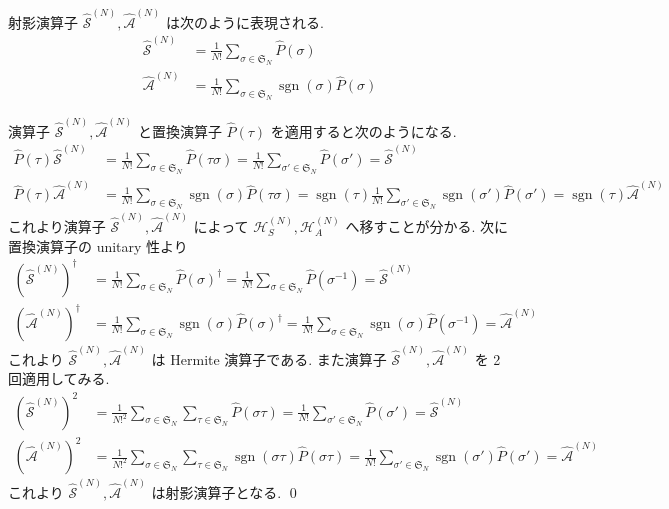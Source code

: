 \documentclass[uplatex,dvipdfmx,a4paper,11pt]{jlreq}
\makeatletter
\DeclareMathOperator{\sgn}{sgn}
\newcommand{\HH}{\mathcal{H}}
\renewcommand{\SS}{\mathfrak{S}}
\renewcommand{\S}{\mathcal{S}}
\newcommand{\A}{\mathcal{A}}
\numberwithin{equation}{section}
\theoremstyle{definition}
\renewenvironment{proof}[1][\proofname]{\par
  \normalfont
  \topsep6\p@\@plus6\p@ \trivlist
  \item[\hskip\labelsep{\bfseries #1}\@addpunct{\bfseries}]\ignorespaces\quad\par
}{%
  \qed\endtrivlist\@endpefalse
}
\renewcommand\proofname{証明}
\makeatother
\begin{document}
\begin{theorem}[Q21-14(i)(ii)(iii)]
  射影演算子 $\hat{\S}^{(N)}, \hat{\A}^{(N)}$ は次のように表現される.
  \begin{align}
    \hat{\S}^{(N)} & = \frac{1}{N!}\sum_{\sigma\in\SS_N}\hat{P}(\sigma)             \\
    \hat{\A}^{(N)} & = \frac{1}{N!}\sum_{\sigma\in\SS_N}\sgn(\sigma)\hat{P}(\sigma)
  \end{align}
\end{theorem}
\begin{proof}
  演算子 $\hat{\S}^{(N)}, \hat{\A}^{(N)}$ と置換演算子 $\hat{P}(\tau)$ を適用すると次のようになる.
  \begin{align}
    \hat{P}(\tau)\hat{\S}^{(N)} & = \frac{1}{N!}\sum_{\sigma\in\SS_N}\hat{P}(\tau\sigma) = \frac{1}{N!}\sum_{\sigma'\in\SS_N}\hat{P}(\sigma') = \hat{\S}^{(N)}                                              \\
    \hat{P}(\tau)\hat{\A}^{(N)} & = \frac{1}{N!}\sum_{\sigma\in\SS_N}\sgn(\sigma)\hat{P}(\tau\sigma) = \sgn(\tau)\frac{1}{N!}\sum_{\sigma'\in\SS_N}\sgn(\sigma')\hat{P}(\sigma') = \sgn(\tau)\hat{\A}^{(N)}
  \end{align}
  これより演算子 $\hat{\S}^{(N)}, \hat{\A}^{(N)}$ によって $\HH_S^{(N)}, \HH_A^{(N)}$ へ移すことが分かる.
  次に置換演算子の unitary 性より
  \begin{align}
    (\hat{\S}^{(N)})^\dagger & = \frac{1}{N!}\sum_{\sigma\in\SS_N}\hat{P}(\sigma)^\dagger = \frac{1}{N!}\sum_{\sigma\in\SS_N}\hat{P}(\sigma^{-1}) = \hat{\S}^{(N)}                         \\
    (\hat{\A}^{(N)})^\dagger & = \frac{1}{N!}\sum_{\sigma\in\SS_N}\sgn(\sigma)\hat{P}(\sigma)^\dagger = \frac{1}{N!}\sum_{\sigma\in\SS_N}\sgn(\sigma)\hat{P}(\sigma^{-1}) = \hat{\A}^{(N)}
  \end{align}
  これより $\hat{\S}^{(N)}, \hat{\A}^{(N)}$ は Hermite 演算子である. また演算子 $\hat{\S}^{(N)}, \hat{\A}^{(N)}$ を 2 回適用してみる.
  \begin{align}
    (\hat{\S}^{(N)})^2 & = \frac{1}{N!^2}\sum_{\sigma\in\SS_N}\sum_{\tau\in\SS_N}\hat{P}(\sigma\tau) = \frac{1}{N!}\sum_{\sigma'\in\SS_N}\hat{P}(\sigma') = \hat{\S}^{(N)}                              \\
    (\hat{\A}^{(N)})^2 & = \frac{1}{N!^2}\sum_{\sigma\in\SS_N}\sum_{\tau\in\SS_N}\sgn(\sigma\tau)\hat{P}(\sigma\tau) = \frac{1}{N!}\sum_{\sigma'\in\SS_N}\sgn(\sigma')\hat{P}(\sigma') = \hat{\A}^{(N)}
  \end{align}
  これより $\hat{\S}^{(N)}, \hat{\A}^{(N)}$ は射影演算子となる.
\end{proof}
\end{document}
